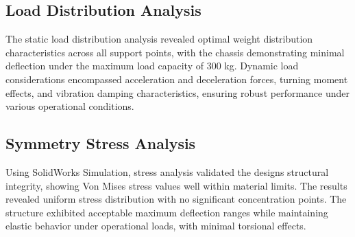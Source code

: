 \documentclass[../../main]{subfiles}
\begin{document}




\subsection{Load Distribution
Analysis}\label{load-distribution-analysis}

The static load distribution analysis revealed optimal weight
distribution characteristics across all support points, with the chassis
demonstrating minimal deflection under the maximum load capacity of 300
kg. Dynamic load considerations encompassed acceleration and
deceleration forces, turning moment effects, and vibration damping
characteristics, ensuring robust performance under various operational
conditions.


\subsection{Symmetry Stress Analysis}\label{symmetry-stress-analysis}

Using SolidWorks Simulation, stress analysis validated the
design\textquotesingle s structural integrity, showing Von Mises stress
values well within material limits. The results revealed uniform stress
distribution with no significant concentration points. The structure
exhibited acceptable maximum deflection ranges while maintaining elastic
behavior under operational loads, with minimal torsional effects.
\end{document}
